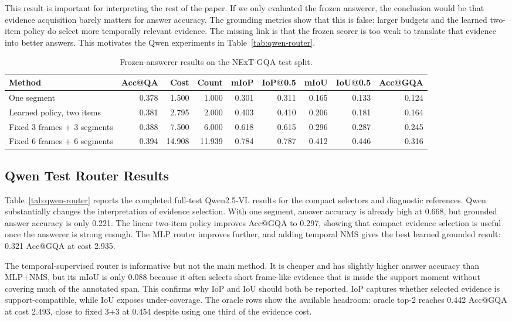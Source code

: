 \documentclass{article}
\begin{document}
This result is important for interpreting the rest of the paper. If we only evaluated the frozen answerer, the conclusion would be that evidence acquisition barely matters for answer accuracy. The grounding metrics show that this is false: larger budgets and the learned two-item policy do select more temporally relevant evidence. The missing link is that the frozen scorer is too weak to translate that evidence into better answers. This motivates the Qwen experiments in Table~\ref{tab:qwen-router}.

\begin{table}[t]
  \centering
  \scriptsize
  \caption{Frozen-answerer results on the NExT-GQA test split.}
  \label{tab:frozen-test}
  \begin{tabular}{lrrrrrrrr}
    \toprule
    Method & Acc@QA & Cost & Count & mIoP & IoP@0.5 & mIoU & IoU@0.5 & Acc@GQA \\
    \midrule
    One segment & 0.378 & 1.500 & 1.000 & 0.301 & 0.311 & 0.165 & 0.133 & 0.124 \\
    Learned policy, two items & 0.381 & 2.795 & 2.000 & 0.403 & 0.410 & 0.206 & 0.181 & 0.164 \\
    Fixed 3 frames + 3 segments & 0.388 & 7.500 & 6.000 & 0.618 & 0.615 & 0.296 & 0.287 & 0.245 \\
    Fixed 6 frames + 6 segments & 0.394 & 14.908 & 11.939 & 0.784 & 0.787 & 0.412 & 0.446 & 0.316 \\
    \bottomrule
  \end{tabular}
\end{table}

\subsection{Qwen Test Router Results}
Table~\ref{tab:qwen-router} reports the completed full-test Qwen2.5-VL results for the compact selectors and diagnostic references. Qwen substantially changes the interpretation of evidence selection. With one segment, answer accuracy is already high at 0.668, but grounded answer accuracy is only 0.221. The linear two-item policy improves Acc@GQA to 0.297, showing that compact evidence selection is useful once the answerer is strong enough. The MLP router improves further, and adding temporal NMS gives the best learned grounded result: 0.321 Acc@GQA at cost 2.935.

The temporal-supervised router is informative but not the main method. It is cheaper and has slightly higher answer accuracy than MLP+NMS, but its mIoU is only 0.088 because it often selects short frame-like evidence that is inside the support moment without covering much of the annotated span. This confirms why IoP and IoU should both be reported. IoP captures whether selected evidence is support-compatible, while IoU exposes under-coverage. The oracle rows show the available headroom: oracle top-2 reaches 0.442 Acc@GQA at cost 2.493, close to fixed 3+3 at 0.454 despite using one third of the evidence cost.
\end{document}

